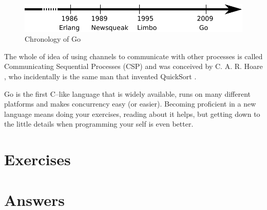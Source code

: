 \begin{figure}[H]
\caption{Chronology of Go}
\label{fig:chrono-of-go}
\begin{center}
\includegraphics[scale=0.65]{fig/go-history.pdf}
\end{center}
\end{figure}

The whole of idea of using channels to communicate with other processes
is called Communicating Sequential Processes (CSP) and was conceived
by C. A. R. Hoare \cite{hoare}, who incidentally is the same man that
invented QuickSort \cite{Quicksort}.

\begin{lbar}
Go is the first C--like language that is widely available,
runs on many
different platforms and makes concurrency easy (or easier).
Becoming proficient in a new language means doing your exercises,
reading about it helps, but getting down to the little details when 
programming your self is even better.
\end{lbar}

\section{Exercises}


\cleardoublepage
\section{Answers}
\shipoutAnswer

